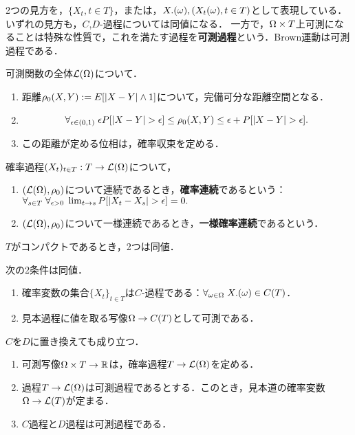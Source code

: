 \documentclass[uplatex,dvipdfmx]{jsreport}
\begin{document}
\begin{tcolorbox}[colframe=ForestGreen, colback=ForestGreen!10!white,breakable,colbacktitle=ForestGreen!40!white,coltitle=black,fonttitle=\bfseries\sffamily,
title=]
    2つの見方を，$\{X_t,t\in T\}$，または，$X.(\omega),(X_t(\omega),t\in T)$として表現している．
    いずれの見方も，$C$,$D$-過程については同値になる．
    一方で，$\Omega\times T$上可測になることは特殊な性質で，これを満たす過程を\textbf{可測過程}という．Brown運動は可測過程である．
\end{tcolorbox}

\begin{lemma}
    可測関数の全体$\mathcal{L}(\Omega)$について．
    \begin{enumerate}
        \item 距離$\rho_0(X,Y):=E[\lvert X-Y\rvert\land 1]$について，完備可分な距離空間となる．
        \item \[\forall_{\epsilon\in(0,1)}\;\epsilon P[\lvert X-Y\rvert>\epsilon]\le\rho_0(X,Y)\le\epsilon+P[\lvert X-Y\rvert>\epsilon].\]
        \item この距離が定める位相は，確率収束を定める．
    \end{enumerate}
\end{lemma}

\begin{definition}[確率過程の連続性]
    確率過程$(X_t)_{t\in T}:T\to\mathcal{L}(\Omega)$について，
    \begin{enumerate}
        \item $(\mathcal{L}(\Omega),\rho_0)$について連続であるとき，\textbf{確率連続}であるという：$\forall_{s\in T}\;\forall_{\epsilon>0}\;\lim_{t\to s}P[\lvert X_t-X_s\rvert>\epsilon]=0.$
        \item $(\mathcal{L}(\Omega),\rho_0)$について一様連続であるとき，\textbf{一様確率連続}であるという．
    \end{enumerate}
    $T$がコンパクトであるとき，2つは同値．
\end{definition}

\begin{theorem}[2つのcurryingの等価性]
    次の2条件は同値．
    \begin{enumerate}
        \item 確率変数の集合$\{X_t\}_{t\in T}$は$C$-過程である：$\forall_{\omega\in\Omega}\;X.(\omega)\in C(T)$．
        \item 見本過程に値を取る写像$\Omega\to C(T)$として可測である．
    \end{enumerate}
    $C$を$D$に置き換えても成り立つ．
\end{theorem}

\begin{theorem}[可測過程]\mbox{}
    \begin{enumerate}
        \item 可測写像$\Omega\times T\to\mathbb{R}$は，確率過程$T\to\mathcal{L}(\Omega)$を定める．
        \item 過程$T\to\mathcal{L}(\Omega)$は可測過程であるとする．このとき，見本道の確率変数$\Omega\to\mathcal{L}(T)$が定まる．
        \item $C$過程と$D$過程は可測過程である．
    \end{enumerate}
\end{theorem}
\end{document}
